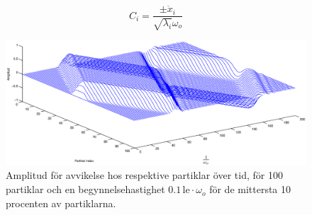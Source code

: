 \documentclass[12pt,a4paper]{article}
\begin{document}
		\begin{equation*}
			C_i = \frac{\pm \dot{x}_i}{\sqrt{\lambda_i} \omega_o}
		\end{equation*}
		
		\begin{figure}
			\hspace{-1.5cm}\includegraphics[width=1.2\textwidth]{oscillations-over-time.eps}
			\caption{Amplitud för avvikelse hos respektive partiklar över tid, för 100 partiklar och en
			begynnelsehastighet $0.1 \, \mathrm{le} \cdot \omega_o$ för de mittersta 10 procenten av partiklarna.}
			\label{oscot}
		\end{figure}
	
	\clearpage
	
\end{document}

